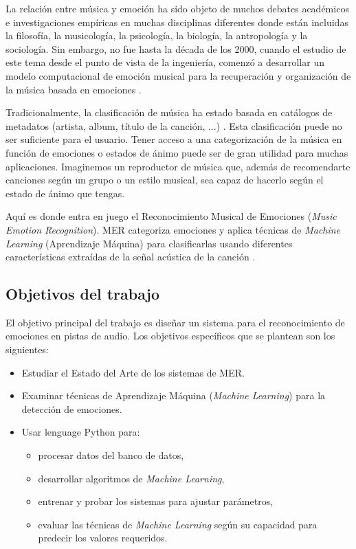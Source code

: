 \documentclass[12pt,a4paper,Spanish]{article}
\begin{document}
La relación entre música y emoción ha sido objeto de muchos debates académicos e investigaciones empíricas en muchas disciplinas diferentes donde están incluidas la filosofía, la musicología, la psicología, la biología, la antropología y la sociología. Sin embargo, no fue hasta la década de los 2000, cuando el estudio de este tema desde el punto de vista de la ingeniería, comenzó a desarrollar un modelo computacional de emoción musical para la recuperación y organización de la música basada en emociones \cite{yang2011music}.
\newline

Tradicionalmente, la clasificación de música ha estado basada en catálogos de metadatos (artista, album, título de la canción, ...) \cite{yang2011music}. Esta clasificación puede no ser suficiente para el usuario. Tener acceso a una categorización de la música en función de emociones o estados de ánimo puede ser de gran utilidad para muchas aplicaciones. Imaginemos un reproductor de música que, además de recomendarte canciones según un grupo o un estilo musical, sea capaz de hacerlo según el estado de ánimo que tengas.
\newline

Aquí es donde entra en juego el Reconocimiento Musical de Emociones (\textit{Music Emotion Recognition}). MER categoriza emociones y aplica técnicas de \textit{Machine Learning} (Aprendizaje Máquina) para clasificarlas usando diferentes características extraídas de la señal acústica de la canción \cite{yang2011music}.



\subsection{Objetivos del trabajo}
El objetivo principal del trabajo es diseñar un sistema para el reconocimiento de emociones en pistas de audio.
Los objetivos específicos que se plantean son los siguientes:
\begin{itemize}
\item Estudiar el Estado del Arte de los sistemas de MER.
\item Examinar técnicas de Aprendizaje Máquina (\textit{Machine Learning}) para la detección de emociones.
\item Usar lenguage Python para:
 	\begin{itemize}
 		\item procesar datos del banco de datos, 
 		\item desarrollar algoritmos de \textit{Machine Learning},
 		\item entrenar y probar los sistemas para ajustar parámetros,
 		\item evaluar las técnicas de \textit{Machine Learning} según su capacidad para predecir los valores requeridos. 		
 	\end{itemize}
\end{itemize}
\end{document}
